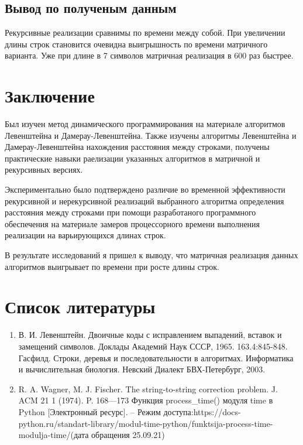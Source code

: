 \documentclass[12pt]{report}
\begin{document}
\par
\section{Вывод по полученым данным}
Рекурсивные реализации сравнимы по времени между собой. При увеличении длины строк становится очевидна выигрышность по времени матричного варианта. Уже при длине в 7 символов матричная реализация в 600 раз быстрее.

\chapter*{Заключение}
Был изучен метод динамического программирования на материале алгоритмов Левенштейна и Дамерау-Левенштейна.
Также изучены алгоритмы Левенштейна и Дамерау-Левенштейна нахождения расстояния между строками, получены практические навыки раелизации указанных алгоритмов
в матричной  и рекурсивных версиях. 

Экспериментально было подтверждено различие во временной эффективности рекурсивной и нерекурсивной реализаций выбранного алгоритма определения расстояния между строками при помощи разработаного программного обеспечения на материале замеров процессорного времени выполнения реализации на варьирующихся длинах строк. 

В результате исследований я пришел к выводу, что матричная реализация данных алгоритмов выигрывает по времени при росте длины строк.


\chapter*{Список литературы}
\begin{enumerate}
    \item В. И. Левенштейн. Двоичные коды с исправлением выпадений, вставок и замещений символов. Доклады Академий Наук СССР, 1965. 163.4:845-848.
     Гасфилд. Строки, деревья и последовательности в алгоритмах. Информатика и вычислительная биология. Невский Диалект БВХ-Петербург, 2003.
    \item R. A. Wagner, M. J. Fischer. The string-to-string correction problem. J. ACM 21 1 (1974). P. 168—173
     Функция process\_time() модуля time в Python $[$Электронный ресурс$]$. – Режим доступа:https://docs-python.ru/standart-library/modul-time-python/funktsija-process-time-modulja-time/(дата обращения 25.09.21)
\end{enumerate}
\end{document}
